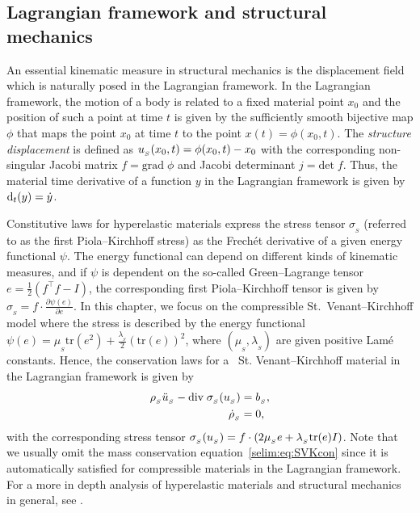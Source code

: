 \subsection{Lagrangian framework and structural mechanics}

An essential kinematic measure in structural mechanics is the
displacement field which is naturally posed in the Lagrangian
framework.  In the Lagrangian framework, the motion of a body is
related to a fixed material point $x_0$ and the position of
such a point at time $t$ is given by the sufficiently smooth bijective
map $\phi$ that maps the point $x_0$ at time $t$ to the point $x(t)=
\phi(x_0,t)$. The \emph{structure displacement} is defined as
$u_{_{S}}(x_0,t) = \phi(x_0, t) - x_0$ with the corresponding non-singular
Jacobi matrix $f = \textrm{grad}\;\phi$ and Jacobi determinant $j =
\textrm{det}\; f$. Thus, the material time derivative of a function $y$
in the Lagrangian framework is given by $\textrm{d}_t(y) = \dot{y}$.

Constitutive laws for hyperelastic materials express the stress tensor
$\sigma_{_{S}}$ (referred to as the first Piola--Kirchhoff stress)
as the Frech\'{e}t derivative of a given energy functional $\psi$.
The energy functional can depend on different kinds of kinematic measures,
and if $\psi$ is dependent on the so-called Green--Lagrange tensor $e=
\tfrac{1}{2}(f^{\top}f -I)$, the corresponding first Piola--Kirchhoff
tensor is given by $\sigma_{_{S}} = f\cdot\frac{\partial \psi(e)}{\partial
e}$. In this chapter, we focus on the compressible St.~Venant--Kirchhoff
model where the stress is described by the energy functional $\psi(e) =
\mu_{_{S}}\textrm{tr}(e^2) + \frac{\lambda_{_{S}}}{2}(\textrm{tr}(e))^2$,
where $(\mu_{_{S}},\lambda_{_{S}})$ are given positive Lam\'{e}
constants. Hence, the conservation laws for a ~St. Venant--Kirchhoff
material in the Lagrangian framework is given by
\begin{align}
\label{selim:eq:SVKmom}
\rho_{_{S}} \ddot{u}_{_{S}} - \textrm{div}\;\sigma_{_{S}}(u_{_{S}}) &= b_{_{S}},
\\
\label{selim:eq:SVKcon}
\dot{\rho}_{_{S}}&=0,
\end{align}
with the corresponding stress tensor $\sigma_{_{S}}(u_{_{S}}) = f\cdot(2\mu_{_{S}}e
+ \lambda_{_{S}} \textrm{tr}(e)I)$.  Note that we usually omit the mass
conservation equation~\eqref{selim:eq:SVKcon} since it is automatically
satisfied for compressible materials in the Lagrangian framework.  For a
more in depth analysis of hyperelastic materials and structural mechanics
in general, see \citet{Gurtin1981,Holzapfel2000}.

